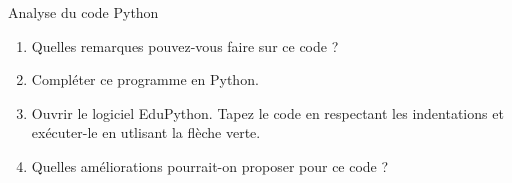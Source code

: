 \vspace{1cm}

Analyse du code Python
\vspace{0.2cm}

\begin{enumerate}
 
	\item Quelles remarques pouvez-vous faire sur ce code ?
	\item Compléter ce programme en Python.
	\item Ouvrir le logiciel EduPython. Tapez le code en respectant les indentations et exécuter-le en utlisant la flèche verte.
 
\item Quelles améliorations pourrait-on proposer pour ce code ?
\end{enumerate}